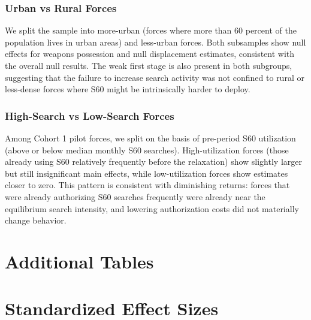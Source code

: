 \documentclass[12pt]{article}
\begin{document}
\subsubsection*{Urban vs Rural Forces}

We split the sample into more-urban (forces where more than 60 percent of the population lives in urban areas) and less-urban forces. Both subsamples show null effects for weapons possession and null displacement estimates, consistent with the overall null results. The weak first stage is also present in both subgroups, suggesting that the failure to increase search activity was not confined to rural or less-dense forces where S60 might be intrinsically harder to deploy.

\subsubsection*{High-Search vs Low-Search Forces}

Among Cohort 1 pilot forces, we split on the basis of pre-period S60 utilization (above or below median monthly S60 searches). High-utilization forces (those already using S60 relatively frequently before the relaxation) show slightly larger but still insignificant main effects, while low-utilization forces show estimates closer to zero. This pattern is consistent with diminishing returns: forces that were already authorizing S60 searches frequently were already near the equilibrium search intensity, and lowering authorization costs did not materially change behavior.


\section{Additional Tables}
\label{sec:additional_tables}

\section{Standardized Effect Sizes}
\label{sec:sde}


\end{document}
